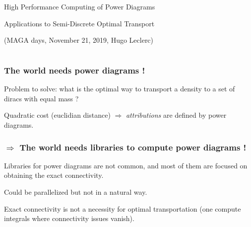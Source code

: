 \documentclass[aspectratio=169]{beamer}
\begin{document}
\begin{frame}
    \begin{center}
        {\huge High Performance Computing of Power Diagrams}

        \bigskip
        {\large Applications to Semi-Discrete Optimal Transport}
      
        \vfill
        {(MAGA days, November 21, 2019, Hugo Leclerc)}
    \end{center}
\end{frame}

\section{}

\begin{frame}
    \frametitle{The world needs power diagrams !}

    \begin{minipage}{0.5\textwidth}
        Problem to solve: what is the optimal way to transport a density to a set of diracs with equal mass ? 
        
        \bigskip
        Quadratic cost (euclidian distance) $\Rightarrow$ \textit{attributions} are defined by power diagrams.
    \end{minipage}
    \kern 0.5cm
    \begin{minipage}{0.45\textwidth}
        \begin{center}
        \end{center}
    \end{minipage}

    
\end{frame}

\begin{frame}
    \frametitle{$\Rightarrow$ The world needs libraries to compute power diagrams !}

    Libraries for power diagrams are not common, and most of them are focused on obtaining the exact connectivity.
    
    \vfill
    Could be parallelized but not in a natural way.
    
    \vfill
    Exact connectivity is not a necessity for optimal transportation (one compute integrals where connectivity issues vanish).
\end{frame}
\end{document}
